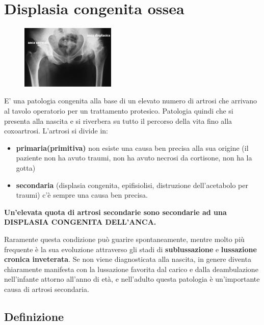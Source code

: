 \section{Displasia congenita ossea}

\begin{figure}[!ht]
\centering
\includegraphics[width=0.4\textwidth]{018/image1.jpeg}
\end{figure}

E' una patologia congenita alla base di un elevato numero di artrosi che arrivano al tavolo operatorio per un trattamento protesico. Patologia quindi che si presenta alla nascita e si riverbera su tutto il percorso della vita fino alla coxoartrosi. L'artrosi si divide in:
\begin{itemize}
\item \textbf{primaria(primitiva)} non esiste una causa ben precisa alla sua origine (il paziente non ha avuto traumi, non ha avuto necrosi da cortisone, non ha la gotta)
\item \textbf{secondaria} (displasia congenita, epifisiolisi, distruzione dell'acetabolo per traumi) c'è sempre una causa ben precisa.
\end{itemize}
\textbf{Un'elevata quota di artrosi secondarie sono secondarie ad una DISPLASIA CONGENITA DELL'ANCA.}

Raramente questa condizione può guarire spontaneamente, mentre molto più frequente è la sua evoluzione attraverso gli stadi di \textbf{sublussazione} e \textbf{lussazione cronica inveterata}. Se non viene diagnosticata alla nascita, in genere diventa chiaramente manifesta con la lussazione favorita dal carico e dalla deambulazione
nell'infante attorno all'anno di età, e nell'adulto questa patologia è un'importante causa di artrosi secondaria.

\subsection{Definizione}

